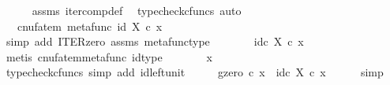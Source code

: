 \begin{isabellebody}
\ \ \ \ \isamarkupfalse%
\ assms\ iter{\isacharunderscore}{\kern0pt}comp{\isacharunderscore}{\kern0pt}def{}\ \isamarkupfalse%
\ {\isacharparenleft}{\kern0pt}typecheck{\isacharunderscore}{\kern0pt}cfuncs{\isacharcomma}{\kern0pt}\ auto{\isacharparenright}{\kern0pt}\isanewline
\ \ \isamarkupfalse%
\ \isamarkupfalse%
\ {\isachardoublequoteopen}{\isachardot}{\kern0pt}{\isachardot}{\kern0pt}{\isachardot}{\kern0pt}\ {\isacharequal}{\kern0pt}\ cnufatem\ {\isacharparenleft}{\kern0pt}metafunc\ {\isacharparenleft}{\kern0pt}id\ X{\isacharparenright}{\kern0pt}{\isacharparenright}{\kern0pt}\ {\isasymcirc}\isactrlsub c\ x{\isachardoublequoteclose}\isanewline
\ \ \ \ \isamarkupfalse%
\ {\isacharparenleft}{\kern0pt}simp\ add{\isacharcolon}{\kern0pt}\ ITER{\isacharunderscore}{\kern0pt}zero{\isacharprime}{\kern0pt}\ assms\ metafunc{\isacharunderscore}{\kern0pt}type{\isacharparenright}{\kern0pt}\isanewline
\ \ \isamarkupfalse%
\ \isamarkupfalse%
\ {\isachardoublequoteopen}{\isachardot}{\kern0pt}{\isachardot}{\kern0pt}{\isachardot}{\kern0pt}\ {\isacharequal}{\kern0pt}\ id\isactrlsub c\ X\ {\isasymcirc}\isactrlsub c\ x{\isachardoublequoteclose}\isanewline
\ \ \ \ \isamarkupfalse%
\ {\isacharparenleft}{\kern0pt}metis\ cnufatem{\isacharunderscore}{\kern0pt}metafunc\ id{\isacharunderscore}{\kern0pt}type{\isacharparenright}{\kern0pt}\isanewline
\ \ \isamarkupfalse%
\ \isamarkupfalse%
\ {\isachardoublequoteopen}{\isachardot}{\kern0pt}{\isachardot}{\kern0pt}{\isachardot}{\kern0pt}\ {\isacharequal}{\kern0pt}\ x{\isachardoublequoteclose}\isanewline
\ \ \ \ \isamarkupfalse%
\ {\isacharparenleft}{\kern0pt}typecheck{\isacharunderscore}{\kern0pt}cfuncs{\isacharcomma}{\kern0pt}\ simp\ add{\isacharcolon}{\kern0pt}\ id{\isacharunderscore}{\kern0pt}left{\isacharunderscore}{\kern0pt}unit{}{\isacharparenright}{\kern0pt}\isanewline
\ \ \isamarkupfalse%
\ \isamarkupfalse%
\ {\isachardoublequoteopen}{\isacharparenleft}{\kern0pt}g\isactrlbsup {\isasymcirc}zero\isactrlesup {\isacharparenright}{\kern0pt}\ {\isasymcirc}\isactrlsub c\ x\ {\isacharequal}{\kern0pt}\ id\isactrlsub c\ X\ {\isasymcirc}\isactrlsub c\ x{\isachardoublequoteclose}\isanewline
\ \ \ \ \isamarkupfalse%
\ simp\isanewline
{}\isamarkupfalse%
%
\endisatagproof
{\isafoldproof}%
%
\isadelimproof
\isanewline
%
\endisadelimproof
\isanewline
{}\isamarkupfalse%

\end{isabellebody}
